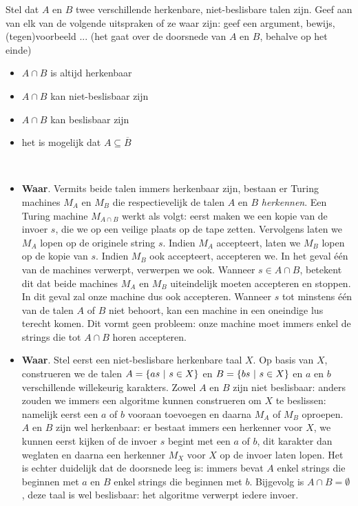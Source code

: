 \documentclass{article}
\begin{document}
\begin{question}[Beslisbaarheid]
Stel dat $A$ en $B$ twee verschillende herkenbare, niet-beslisbare talen zijn.
Geef aan van elk van de volgende uitspraken of ze waar zijn: geef een
argument, bewijs, (tegen)voorbeeld ... (het gaat over de doorsnede van $A$ en
$B$, behalve op het einde)
\begin{itemize}
\item $A \cap B$ is altijd herkenbaar
\item $A \cap B$ kan niet-beslisbaar zijn
\item $A \cap B$ kan beslisbaar zijn
\item het is mogelijk dat $A \subseteq \overline{B}$
\end{itemize}
\begin{answer}
~~
\begin{itemize}
 \item \textbf{Waar}. Vermits beide talen immers herkenbaar zijn, bestaan er Turing machines
 $M_A$ en $M_B$ die respectievelijk de talen $A$ en $B$ \emph{herkennen}. Een Turing
 machine $M_{A\cap B}$ werkt als volgt: eerst maken we een kopie van de invoer $s$, die we op
 een veilige plaats op de tape zetten.
 Vervolgens laten we $M_A$ lopen op de originele string $s$. Indien $M_A$ accepteert,
 laten we $M_B$ lopen op de kopie van $s$. Indien $M_B$ ook accepteert, accepteren we. In het
 geval \'e\'en van de machines verwerpt, verwerpen we ook. Wanneer $s\in A\cap B$, betekent dit dat
 beide machines $M_A$ en $M_B$ uiteindelijk moeten accepteren en stoppen. In dit geval zal onze machine
 dus ook accepteren. Wanneer $s$ tot minstens \'e\'en van de talen $A$ of $B$ niet behoort, kan een
 machine in een oneindige lus terecht komen. Dit vormt geen probleem: onze machine moet immers
 enkel de strings die tot $A\cap B$ horen accepteren.
 \item \textbf{Waar}. Stel eerst een niet-beslisbare herkenbare taal $X$. Op basis van $X$, construeren we de talen $A=\left\{ as\ |\ s\in X \right\}$ en $B=\left\{ bs\ |\ s\in X \right\}$ en $a$ en $b$ verschillende willekeurig karakters. Zowel $A$ en $B$ zijn niet beslisbaar: anders zouden we immers een algoritme kunnen construeren om $X$ te beslissen: namelijk eerst een $a$ of $b$ vooraan toevoegen en daarna $M_A$ of $M_B$ oproepen. $A$ en $B$ zijn wel herkenbaar: er bestaat immers een herkenner voor $X$, we kunnen eerst kijken of de invoer $s$ begint met een $a$ of $b$, dit karakter dan weglaten en daarna een herkenner $M_X$ voor $X$ op de invoer laten lopen. Het is echter duidelijk dat de doorsnede leeg is: immers bevat $A$ enkel strings die beginnen met $a$ en $B$ enkel strings die beginnen met $b$. Bijgevolg is $A\cap B=\emptyset$, deze taal is wel beslisbaar: het algoritme verwerpt iedere invoer.

\end{itemize}
\end{answer}
\end{question}
\end{document}
